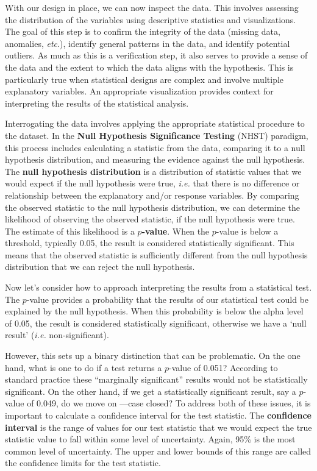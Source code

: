\documentclass[
  letterpaper,
  krantz1]{latex/krantz-mod}
\theoremstyle{definition}
\theoremstyle{definition}
\theoremstyle{remark}
\begin{document}
With our design in place, we can now inspect the data. This involves
assessing the distribution of the variables using descriptive statistics
and visualizations. The goal of this step
is to confirm the integrity of the data (missing
data, anomalies, \emph{etc}.), identify general
patterns in the data, and identify potential outliers.
As much as this is a verification step, it also serves to provide a
sense of the data and the extent to which the data aligns with the
hypothesis. This is particularly true when statistical designs are
complex and involve multiple explanatory variables. An appropriate
visualization provides context for interpreting the results of the
statistical analysis.

Interrogating the data involves applying the appropriate statistical
procedure to the dataset. In the \textbf{Null Hypothesis Significance
Testing} (NHST)
paradigm, this process includes calculating a statistic from the data,
comparing it to a null hypothesis distribution, and measuring the
evidence against the null hypothesis. The \textbf{null hypothesis
distribution} is a distribution of
statistic values that we would expect if the null hypothesis were true,
\emph{i.e.} that there is no difference or relationship between the
explanatory and/or response variables. By comparing the observed
statistic to the null hypothesis distribution, we can determine the
likelihood of observing the observed statistic, if the null hypothesis
were true. The estimate of this likelihood is a
\textbf{\(p\)-value}. When the \(p\)-value is below a
threshold, typically 0.05, the result is considered statistically
significant. This means that the observed statistic is sufficiently
different from the null hypothesis distribution that we can reject the
null hypothesis.

Now let's consider how to approach interpreting the results from a
statistical test. The \(p\)-value provides a probability
that the results of our statistical test could be explained by the null
hypothesis. When this probability is below the alpha level of 0.05, the
result is considered statistically significant, otherwise we have a
`null result' (\emph{i.e.} non-significant).

However, this sets up a binary distinction that can be problematic. On
the one hand, what is one to do if a test returns a \(p\)-value of
0.051? According to standard practice these ``marginally significant''
results would not be statistically significant. On the other hand, if we
get a statistically significant result, say a \(p\)-value of 0.049, do
we move on ---case closed? To address both of these issues, it is
important to calculate a confidence interval for the test statistic. The
\textbf{confidence interval} is the range of
values for our test statistic that we would expect the true statistic
value to fall within some level of uncertainty. Again, 95\% is the most
common level of uncertainty. The upper and lower bounds of this range
are called the confidence limits for the test statistic.
\end{document}
